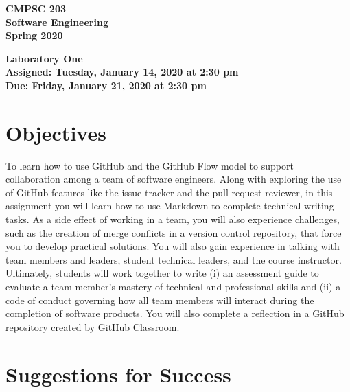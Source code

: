 \documentclass[11pt]{article}
\newcommand{\assignmentduedate}{January 21}
\newcommand{\assignmentassignedate}{January 14}
\newcommand{\assignmentnumber}{One}
\newcommand{\labyear}{2020}
\newcommand{\labdueday}{Friday}
\newcommand{\labassignday}{Tuesday}
\newcommand{\labtime}{2:30 pm}
\newcommand{\assigneddate}{Assigned: \labassignday, \assignmentassignedate, \labyear{} at \labtime{}}
\newcommand{\duedate}{Due: \labdueday, \assignmentduedate, \labyear{} at \labtime{}}
\newcommand{\labtitle}[1]
{
  \begin{center}
    \begin{center}
      \bf
      CMPSC 203\\Software Engineering\\
      Spring 2020\\
      \medskip
    \end{center}
    \bf
    #1
  \end{center}
}
\begin{document}
\thispagestyle{empty}

\labtitle{Laboratory \assignmentnumber{} \\ \assigneddate{} \\ \duedate{}}

\section*{Objectives}

To learn how to use GitHub and the GitHub Flow model to support collaboration
among a team of software engineers. Along with exploring the use of GitHub
features like the issue tracker and the pull request reviewer, in this
assignment you will learn how to use Markdown to complete technical writing
tasks. As a side effect of working in a team, you will also experience
challenges, such as the creation of merge conflicts in a version control
repository, that force you to develop practical solutions. You will also gain
experience in talking with team members and leaders, student technical leaders,
and the course instructor. Ultimately, students will work together to write (i)
an assessment guide to evaluate a team member's mastery of technical and
professional skills and (ii) a code of conduct governing how all team members
will interact during the completion of software products.
%
You will also complete a reflection in a GitHub repository created by GitHub
Classroom.

\section*{Suggestions for Success}
\end{document}
